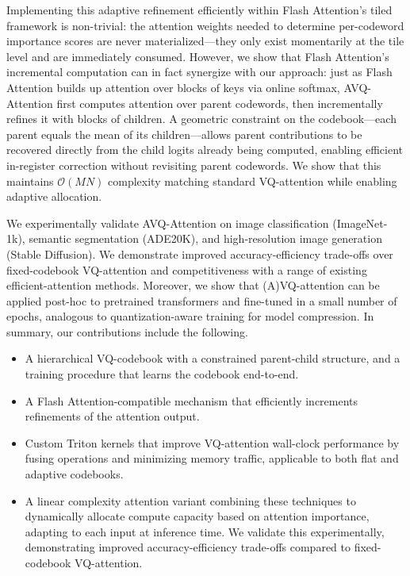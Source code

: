 Implementing this adaptive refinement efficiently within Flash Attention's tiled framework is non-trivial: the attention weights needed to determine per-codeword importance scores are never materialized---they only exist momentarily at the tile level and are immediately consumed. However, we show that Flash Attention's incremental computation can in fact synergize with our approach: just as Flash Attention builds up attention over blocks of keys via online softmax, AVQ-Attention first computes attention over parent codewords, then incrementally refines it with blocks of children. A geometric constraint on the codebook---each parent equals the mean of its children---allows parent contributions to be recovered directly from the child logits already being computed, enabling efficient in-register correction without revisiting parent codewords. We show that this maintains $\mathcal{O}(MN)$ complexity matching standard VQ-attention while enabling adaptive allocation.

We experimentally validate AVQ-Attention on image classification (ImageNet-1k), semantic segmentation (ADE20K), and high-resolution image generation (Stable Diffusion). We demonstrate improved accuracy-efficiency trade-offs over fixed-codebook VQ-attention and competitiveness with a range of existing efficient-attention methods. Moreover, we show that (A)VQ-attention can be applied post-hoc to pretrained transformers and fine-tuned in a small number of epochs, analogous to quantization-aware training for model compression.
In summary, our contributions include the following.
\begin{itemize}
\item A hierarchical VQ-codebook with a constrained parent-child structure, and a training procedure that learns the codebook end-to-end.
\item A Flash Attention-compatible mechanism that efficiently increments refinements of the attention output.
\item Custom Triton \cite{tillet2019triton} kernels that improve VQ-attention wall-clock performance by fusing operations and minimizing memory traffic, applicable to both flat and adaptive codebooks.
\item A linear complexity attention variant combining these techniques to dynamically allocate compute capacity based on attention importance, adapting to each input at inference time. We validate this experimentally, demonstrating improved accuracy-efficiency trade-offs compared to fixed-codebook VQ-attention.
\end{itemize}

